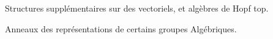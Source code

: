 
Structures supplémentaires sur des vectoriels, et algèbres de Hopf top.

Anneaux des représentations de certains groupes Algébriques.
